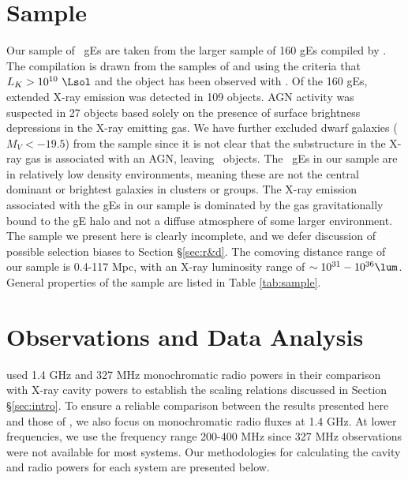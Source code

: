 \documentclass{emulateapj}
\begin{document}
\section{Sample}
\label{sec:sample}

Our sample of \samp\ gEs are taken from the larger sample of 160 gEs
compiled by \citet{jonesge}. The \citet{jonesge} compilation is drawn
from the samples of \citet{1999MNRAS.302..209B} and
\citet{2003MNRAS.340.1375O} using the criteria that $L_K >
10^{10}~\Lsol$ and the object has been observed with \chandra. Of the
160 gEs, extended X-ray emission was detected in 109 objects. AGN
activity was suspected in 27 objects based solely on the presence of
surface brightness depressions in the X-ray emitting gas. We have
further excluded dwarf galaxies ($M_V < -19.5$) from the sample since
it is not clear that the substructure in the X-ray gas is associated
with an AGN, leaving \samp\ objects. The \samp\ gEs in our sample are
in relatively low density environments, meaning these are not the
central dominant or brightest galaxies in clusters or groups. The
X-ray emission associated with the gEs in our sample is dominated by
the gas gravitationally bound to the gE halo and not a diffuse
atmosphere of some larger environment. The sample we present here is
clearly incomplete, and we defer discussion of possible selection
biases to Section \S\ref{sec:r&d}. The comoving distance range of our
sample is 0.4-117 Mpc, with an X-ray luminosity range of $\sim
10^{31}-10^{36} \lum$. General properties of the sample are listed in
Table \ref{tab:sample}.



\section{Observations and Data Analysis}
\label{sec:data}

\citet{birzan08} used 1.4 GHz and 327 MHz monochromatic radio powers
in their comparison with X-ray cavity powers to establish the scaling
relations discussed in Section \S\ref{sec:intro}. To ensure a reliable
comparison between the results presented here and those of
\citet{birzan08}, we also focus on monochromatic radio fluxes at 1.4
GHz. At lower frequencies, we use the frequency range 200-400 MHz
since 327 MHz observations were not available for most systems. Our
methodologies for calculating the cavity and radio powers for each
system are presented below.
\end{document}
